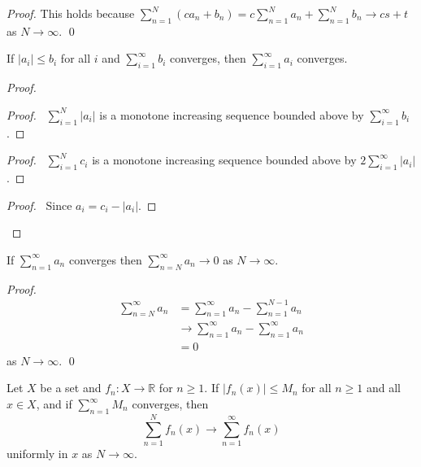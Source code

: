 \begin{proof}
  \pf This holds because $\sum_{n=1}^N (c a_n + b_n) = c \sum_{n=1}^N a_n +
  \sum_{n=1}^N b_n \rightarrow cs + t$ as $N \rightarrow \infty$. \qed
\end{proof}

\begin{thm}
  If $|a_i| \leq b_i$ for all $i$ and $\sum_{i=1}^\infty b_i$ converges, then
  $\sum_{i=1}^\infty a_i$ converges.
\end{thm}

\begin{proof}
  \pf
  \begin{proof}
    \pf\ $\sum_{i=1}^N |a_i|$ is a monotone increasing sequence bounded above
    by $\sum_{i=1}^\infty b_i$.
  \end{proof}
  \begin{proof}
    \pf\ $\sum_{i=1}^N c_i$ is a monotone increasing sequence bounded above
    by
    $2 \sum_{i=1}^\infty |a_i|$.
  \end{proof}
  \qedstep
  \begin{proof}
    \pf\ Since $a_i = c_i - |a_i|$.
  \end{proof}
\end{proof}

\begin{lm}
  \label{lm:topology:metric:tail}
  If $\sum_{n=1}^\infty a_n$ converges then $\sum_{n=N}^\infty a_n
  \rightarrow 0$ as $N \rightarrow \infty$.
\end{lm}

\begin{proof}
  \pf
  \begin{align*}
    \sum_{n=N}^\infty a_n & = \sum_{n=1}^\infty a_n - \sum_{n=1}^{N-1} a_n \\
    & \rightarrow \sum_{n=1}^\infty a_n - \sum_{n=1}^\infty a_n \\
    & = 0
  \end{align*}
  as $N \rightarrow \infty$. \qed
\end{proof}

\begin{thm}
  Let $X$ be a set and $f_n : X \rightarrow \mathbb{R}$ for $n \geq 1$. If
  $|f_n(x)| \leq M_n$ for all $n \geq 1$ and all $x \in X$, and if
  $\sum_{n=1}^\infty M_n$ converges, then
  \[ \sum_{n=1}^N f_n(x) \rightarrow \sum_{n=1}^\infty f_n(x) \]
  uniformly in $x$ as $N \rightarrow \infty$.
\end{thm}

